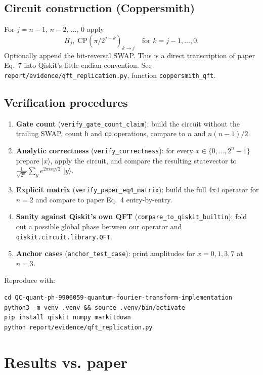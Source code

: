 \documentclass[11pt]{article}
\begin{document}
\subsection{Circuit construction (Coppersmith)}
For $j = n-1,\, n-2,\, \ldots,\, 0$ apply
\[
  H_j,\; \text{CP}(\pi/2^{j-k})_{k \to j}\quad\text{for } k=j-1,\ldots,0.
\]
Optionally append the bit-reversal SWAP. This is a direct transcription
of paper Eq.~7 into Qiskit's little-endian convention. See
\texttt{report/evidence/qft\_replication.py}, function
\texttt{coppersmith\_qft}.

\subsection{Verification procedures}
\begin{enumerate}
  \item \textbf{Gate count} (\texttt{verify\_gate\_count\_claim}):
        build the circuit without the trailing SWAP, count \texttt{h}
        and \texttt{cp} operations, compare to $n$ and $n(n-1)/2$.
  \item \textbf{Analytic correctness} (\texttt{verify\_correctness}):
        for every $x\in\{0,\ldots,2^n-1\}$ prepare $|x\rangle$, apply
        the circuit, and compare the resulting statevector to
        $\frac{1}{\sqrt{2^n}}\sum_y e^{2\pi i x y / 2^n}|y\rangle$.
  \item \textbf{Explicit matrix} (\texttt{verify\_paper\_eq4\_matrix}):
        build the full 4x4 operator for $n=2$ and compare to paper Eq.~4
        entry-by-entry.
  \item \textbf{Sanity against Qiskit's own QFT}
        (\texttt{compare\_to\_qiskit\_builtin}): fold out a possible
        global phase between our operator and
        \texttt{qiskit.circuit.library.QFT}.
  \item \textbf{Anchor cases} (\texttt{anchor\_test\_case}): print
        amplitudes for $x=0,1,3,7$ at $n=3$.
\end{enumerate}
Reproduce with:
\begin{verbatim}
cd QC-quant-ph-9906059-quantum-fourier-transform-implementation
python3 -m venv .venv && source .venv/bin/activate
pip install qiskit numpy markitdown
python report/evidence/qft_replication.py
\end{verbatim}

\section{Results vs. paper}
\end{document}
